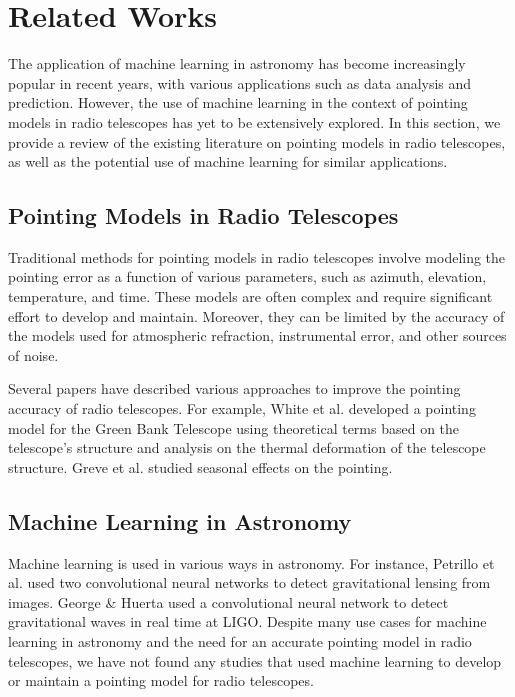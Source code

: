 \section{Related Works}
The application of machine learning in astronomy has become increasingly popular in recent years, with various applications such as data analysis and prediction.
However, the use of machine learning in the context of pointing models in radio telescopes has yet to be extensively explored.
In this section, we provide a review of the existing literature on pointing models in radio telescopes, as well as the potential use of machine learning for similar applications.

\subsection{Pointing Models in Radio Telescopes}
Traditional methods for pointing models in radio telescopes involve modeling the pointing error as a function of various parameters, such as azimuth, elevation, temperature, and time.
These models are often complex and require significant effort to develop and maintain.
Moreover, they can be limited by the accuracy of the models used for atmospheric refraction, instrumental error, and other sources of noise.

Several papers have described various approaches to improve the pointing accuracy of radio telescopes.
For example, White et al. \cite{whitegreen2022} developed a pointing model for the Green Bank Telescope using theoretical terms based on the telescope's structure and analysis on the thermal deformation of the telescope structure.
Greve et al. \cite{greve1996pointing} studied seasonal effects on the pointing.

\subsection{Machine Learning in Astronomy}
Machine learning is used in various ways in astronomy.
For instance, Petrillo et al. \cite{mlastgravlens} used two convolutional neural networks to detect gravitational lensing from images.
George \& Huerta \cite{mlastgravitationalwaves} used a convolutional neural network to detect gravitational waves in real time at LIGO.
Despite many use cases for machine learning in astronomy and the need for an accurate pointing model in radio telescopes,
we have not found any studies that used machine learning to develop or maintain a pointing model for radio telescopes.

